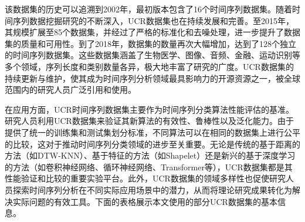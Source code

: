该数据集的历史可以追溯到2002年，最初版本包含了16个时间序列数据集。随着时间序列数据挖掘研究的不断深入，UCR数据集也在持续发展和完善。至2015年，其规模扩展至85个数据集，并经过了严格的标准化和去噪处理，进一步提升了数据集的质量和可用性。到了2018年，数据集的数量再次大幅增加，达到了128个独立的时间序列数据集。这些数据集涵盖了生物医学、图像、音频、金融、运动识别等多个领域，序列长度和类别数量各异，极大地丰富了研究的广度。UCR数据集的持续更新与维护，使其成为时间序列分析领域最具影响力的开源资源之一，被全球范围内的研究人员广泛引用和使用。

在应用方面，UCR时间序列数据集主要作为时间序列分类算法性能评估的基准。研究人员利用UCR数据集来验证其新算法的有效性、鲁棒性以及泛化能力。由于提供了统一的训练集和测试集划分标准，不同算法可以在相同的数据集上进行公平的比较，这对于推动时间序列分类领域的进步至关重要。无论是传统的基于距离的方法（如DTW-KNN）、基于特征的方法（如Shapelet）还是新兴的基于深度学习的方法（如卷积神经网络、循环神经网络、Transformer等），UCR数据集都是其性能验证和比较的重要实验平台。此外，UCR数据集的领域多样性也促使研究人员探索时间序列分析在不同实际应用场景中的潜力，从而将理论研究成果转化为解决实际问题的有效工具。下面的表格展示本文使用的部分UCR数据集的基本信息。

